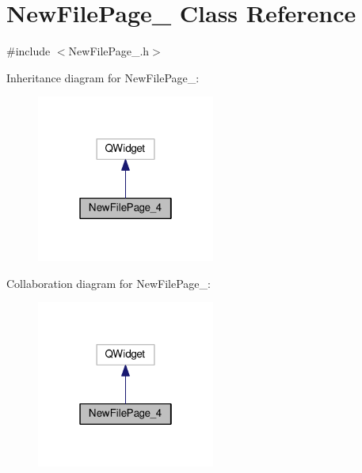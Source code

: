 \hypertarget{class_new_file_page__4}{\section{New\-File\-Page\-\_ Class Reference}
\label{class_new_file_page__4}
}


{\ttfamily \#include $<$New\-File\-Page\-\_.\-h$>$}



Inheritance diagram for New\-File\-Page\-\_\-:\nopagebreak
\begin{figure}[H]
\begin{center}
\leavevmode
\includegraphics[width=166pt]{class_new_file_page__4__inherit__graph}
\end{center}
\end{figure}


Collaboration diagram for New\-File\-Page\-\_\-:\nopagebreak
\begin{figure}[H]
\begin{center}
\leavevmode
\includegraphics[width=166pt]{class_new_file_page__4__coll__graph}
\end{center}
\end{figure}
